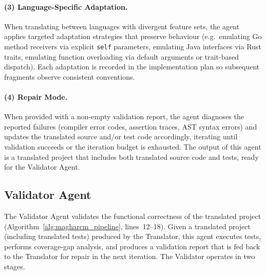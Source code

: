\paragraph{(3) Language-Specific Adaptation.}
When translating between languages with divergent feature sets, the
agent applies targeted adaptation strategies that preserve behaviour
(e.g.\ emulating Go method receivers via explicit \texttt{self}
parameters, emulating Java interfaces via Rust traits, emulating
function overloading via default arguments or trait-based dispatch).
Each adaptation is recorded in the implementation plan so subsequent
fragments observe consistent conventions.

\paragraph{(4) Repair Mode.}
When provided with a non-empty validation report, the agent diagnoses
the reported failures (compiler error codes, assertion traces, AST
syntax errors) and updates the translated source and/or test code
accordingly, iterating until validation succeeds or the iteration
budget is exhausted. The output of this agent is a translated project
that includes both translated source code and tests, ready for the
Validator Agent.

\subsection{Validator Agent}
\label{sec:method_validator}

The Validator Agent validates the functional correctness of the
translated project (Algorithm~\ref{alg:magharcm_pipeline},
lines~12--18). Given a translated project (including translated tests)
produced by the Translator, this agent executes tests, performs
coverage-gap analysis, and produces a validation report that is fed
back to the Translator for repair in the next iteration. The
Validator operates in two stages.

